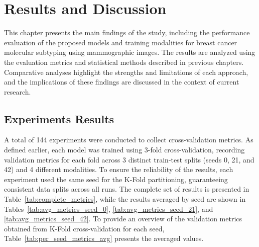\documentclass[a4paper,10pt]{book}
\begin{document}
\chapter{Results and Discussion}

This chapter presents the main findings of the study, including the performance evaluation of the proposed models and training modalities for breast cancer molecular subtyping using mammographic images. The results are analyzed using the evaluation metrics and statistical methods described in previous chapters. Comparative analyses highlight the strengths and limitations of each approach, and the implications of these findings are discussed in the context of current research.

\section{Experiments Results}

A total of 144 experiments were conducted to collect cross-validation metrics. As defined earlier, each model was trained using 3-fold cross-validation, recording validation metrics for each fold across 3 distinct train-test splits (seeds 0, 21, and 42) and 4 different modalities. To ensure the reliability of the results, each experiment used the same seed for the K-Fold partitioning, guaranteeing consistent data splits across all runs. The complete set of results is presented in Table~\ref{tab:complete_metrics}, while the results averaged by seed are shown in Tables~\ref{tab:avg_metrics_seed_0}, \ref{tab:avg_metrics_seed_21}, and \ref{tab:avg_metrics_seed_42}. To provide an overview of the validation metrics obtained from K-Fold cross-validation for each seed, Table~\ref{tab:per_seed_metrics_avg} presents the averaged values.
\end{document}
